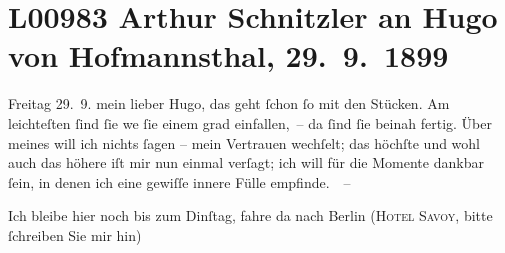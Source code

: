 

\section[Arthur Schnitzler an Hugo von Hofmannsthal, 29. 9. 1899]{L00983 Arthur Schnitzler an Hugo von Hofmannsthal, 29. 9. 1899}
\nopagebreak{}
\rehead{ }\normalsize\beginnumbering{}
\toendnotes[C]{\smallbreak\pagebreak[2]}
\toendnotes[C]{\smallbreak}
\pstart
           \raggedleft{}{\pb}Freitag 29. 9.\pend
           \vspace{0.5em}
\pstart
           mein lieber Hugo, das geht ſchon ſo mit den Stücken. Am leichteſten
               ſind ſie we{\geminationn}{ }ſie einem grad einfallen, – da ſind ſie beinah
               fertig. Über meines will ich nichts ſagen – mein Vertrauen wechſelt; das höchſte und
               wohl auch das höhere iſt mir nun einmal {\pb}verſagt; ich will
               für die Momente dankbar ſein, in denen ich eine gewiſſe innere Fülle empfinde.  –\pend
           
\pstart
           Ich bleibe hier noch bis zum Dinſtag, fahre da{\geminationn} nach Berlin (\textsc{Hotel Savoy}, bitte ſchreiben Sie mir hin)\pend
           
